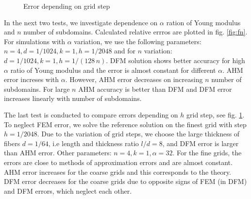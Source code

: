 \documentclass[a4paper]{jpconf}
\begin{document}
\begin{figure}[H]
    \centering
    \caption{Error depending on grid step}
    \label{fig:h}
\end{figure}

In the next two tests, we investigate dependence on $\alpha$ ration of Young modulus and $n$ number of subdomains. Calculated relative errros are plotted in fig. \ref{fig:fn}. For simulations with $\alpha$ variation, we use the following parameters: $n = 4, d = 1/1024, k = 1, h = 1/2048$ and for $n$ variation: $d = 1/1024, k = 1, h = 1/(128\, n)$. DFM solution shows better accuracy for high $\alpha$ ratio of Young modulus and the error is almost constant for different $\alpha$. AHM error increses with $\alpha$. However, AHM error decreases on increasing $n$ number of subdomains. For large $n$ AHM accuracy is better than DFM and DFM error increases linearly with number of subdomains. 

The last test is conducted to compare errors depending on $h$ grid step, see fig. \ref{fig:h}. To neglect FEM error, we solve the reference solution on the finest grid with step $h=1/2048$. Due to the variation of grid steps, we choose the large thickness of fibers $d=1/64$, i.e length and thickness ratio $l/d=8$, and DFM error is larger than AHM error. Other parameters: $n=4, k=1, \alpha=32$.
For the fine grids, the errors are close to methods of approximation errors and are almost constant. AHM error increases for the coarse grids and this corresponds to the theory. DFM error decreases for the coarse grids due to opposite signs of FEM (in DFM) and DFM errors, which neglect each other.
\end{document}
